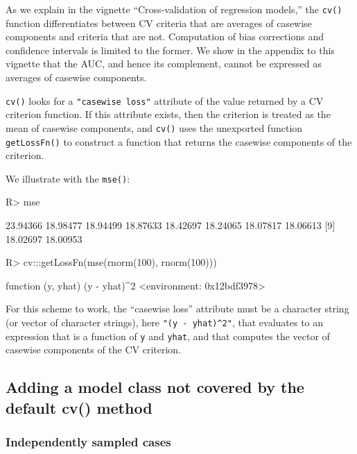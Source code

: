 \documentclass[
]{jss}
\begin{document}
As we explain in the vignette ``Cross-validation of regression models,''
the \texttt{cv()} function differentiates between CV criteria that are
averages of casewise components and criteria that are not. Computation
of bias corrections and confidence intervals is limited to the former.
We show in the appendix to this vignette that the AUC, and hence its
complement, cannot be expressed as averages of casewise components.

\texttt{cv()} looks for a \texttt{"casewise\ loss"} attribute of the
value returned by a CV criterion function. If this attribute exists,
then the criterion is treated as the mean of casewise components, and
\texttt{cv()} uses the unexported function \texttt{getLossFn()} to
construct a function that returns the casewise components of the
criterion.

We illustrate with the \texttt{mse()}:

\begin{CodeChunk}
\begin{CodeInput}
R> mse
\end{CodeInput}
\begin{CodeOutput}
 [1] 23.94366 18.98477 18.94499 18.87633 18.42697 18.24065 18.07817 18.06613
 [9] 18.02697 18.00953
\end{CodeOutput}
\begin{CodeInput}
R> cv:::getLossFn(mse(rnorm(100), rnorm(100)))
\end{CodeInput}
\begin{CodeOutput}
function (y, yhat) 
{
    (y - yhat)^2
}
<environment: 0x12bdf3978>
\end{CodeOutput}
\end{CodeChunk}

For this scheme to work, the ``casewise loss'' attribute must be a
character string (or vector of character strings), here
\texttt{"(y\ -\ yhat)\^{}2"}, that evaluates to an expression that is a
function of \texttt{y} and \texttt{yhat}, and that computes the vector
of casewise components of the CV criterion.

\hypertarget{adding-a-model-class-not-covered-by-the-default-cv-method}{%
\subsection{Adding a model class not covered by the default cv()
method}\label{adding-a-model-class-not-covered-by-the-default-cv-method}}

\hypertarget{independently-sampled-cases}{%
\subsubsection{Independently sampled
cases}\label{independently-sampled-cases}}
\end{document}
